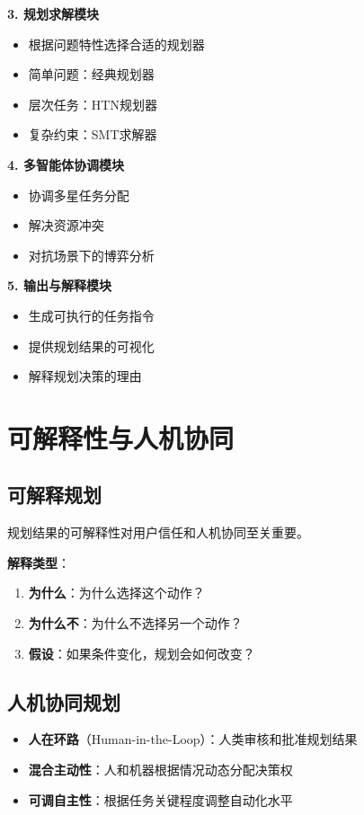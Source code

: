 \textbf{3. 规划求解模块}
\begin{itemize}[leftmargin=2em]
  \item 根据问题特性选择合适的规划器
  \item 简单问题：经典规划器
  \item 层次任务：HTN规划器
  \item 复杂约束：SMT求解器
\end{itemize}

\textbf{4. 多智能体协调模块}
\begin{itemize}[leftmargin=2em]
  \item 协调多星任务分配
  \item 解决资源冲突
  \item 对抗场景下的博弈分析
\end{itemize}

\textbf{5. 输出与解释模块}
\begin{itemize}[leftmargin=2em]
  \item 生成可执行的任务指令
  \item 提供规划结果的可视化
  \item 解释规划决策的理由
\end{itemize}

\section{可解释性与人机协同}

\subsection{可解释规划}

规划结果的可解释性对用户信任和人机协同至关重要。

\textbf{解释类型}：
\begin{enumerate}[leftmargin=2em]
  \item \textbf{为什么}：为什么选择这个动作？
  \item \textbf{为什么不}：为什么不选择另一个动作？
  \item \textbf{假设}：如果条件变化，规划会如何改变？
\end{enumerate}

\subsection{人机协同规划}

\begin{keypoint}[人机协同模式]
\begin{itemize}
  \item \textbf{人在环路}（Human-in-the-Loop）：人类审核和批准规划结果
  \item \textbf{混合主动性}：人和机器根据情况动态分配决策权
  \item \textbf{可调自主性}：根据任务关键程度调整自动化水平
\end{itemize}
\end{keypoint}

